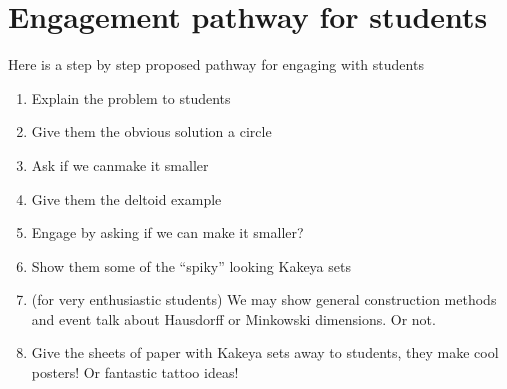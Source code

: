 \documentclass{article}
\begin{document}
	\section{Engagement pathway for students}
	Here is a step by step proposed pathway for engaging with students
	\begin{enumerate}
		\item Explain the problem to students
		\item Give them the obvious solution a circle
		\item Ask if we canmake it smaller
		\item Give them the deltoid example
		\item Engage by asking if we can make it smaller?
		\item Show them some of the ``spiky'' looking Kakeya sets
		\item (for very enthusiastic students) We may show general construction methods and event talk about Hausdorff or Minkowski dimensions. Or not.
		\item Give the sheets of paper with Kakeya sets away to students, they make cool posters! Or fantastic tattoo ideas!
	\end{enumerate}
\end{document}
